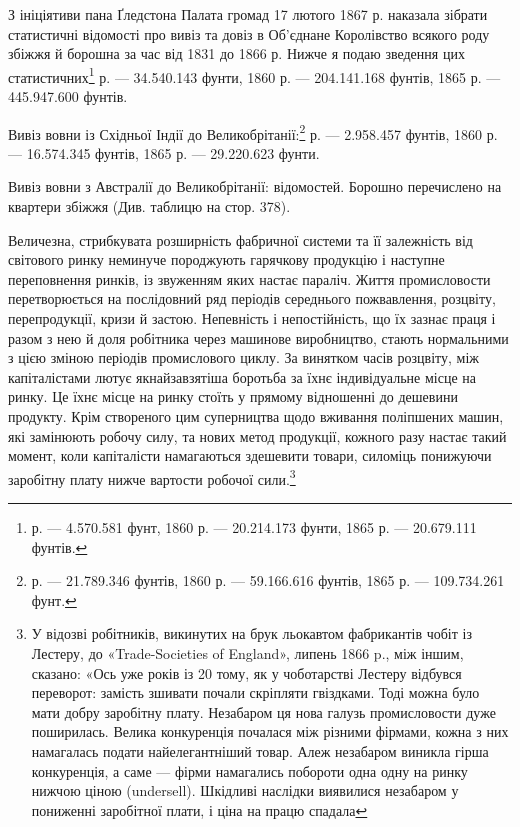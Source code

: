 З ініціятиви пана Ґледстона Палата громад 17 лютого 1867 р.
наказала зібрати статистичні відомості про вивіз та довіз в
Об’єднане Королівство всякого роду збіжжя й борошна за час
від 1831 до 1866 р. Нижче я подаю зведення цих статистичних\footnote{
р. — 4.570.581 фунт, 1860 р. — 20.214.173 фунти, 1865 р. —
20.679.111 фунтів.
} р. — 34.540.143 фунти, 1860 р. — 204.141.168 фунтів, 1865 р. —
445.947.600 фунтів.

Вивіз вовни із Східньої Індії до Великобрітанії:\footnote{
р. — 21.789.346 фунтів, 1860 р. — 59.166.616 фунтів, 1865 р. —
109.734.261 фунт.
} р. — 2.958.457 фунтів, 1860 р. — 16.574.345 фунтів, 1865 р. —
29.220.623 фунти.

Вивіз вовни з Австралії до Великобрітанії:
відомостей. Борошно перечислено на квартери збіжжя (Див.
таблицю на стор. 378).

Величезна, стрибкувата розширність фабричної системи та
її залежність від світового ринку неминуче породжують гарячкову
продукцію і наступне переповнення ринків, із звуженням
яких настає параліч. Життя промисловости перетворюється на
послідовний ряд періодів середнього пожвавлення, розцвіту,
перепродукції, кризи й застою. Непевність і непостійність, що
їх зазнає праця і разом з нею й доля робітника через машинове
виробництво, стають нормальними з цією зміною періодів промислового
циклу. За винятком часів розцвіту, між капіталістами лютує
якнайзавзятіша боротьба за їхнє індивідуальне місце на ринку.
Це їхнє місце на ринку стоїть у прямому відношенні до дешевини
продукту. Крім створеного цим суперництва щодо вживання
поліпшених машин, які замінюють робочу силу, та нових метод
продукції, кожного разу настає такий момент, коли капіталісти
намагаються здешевити товари, силоміць понижуючи заробітну
плату нижче вартости робочої сили.\footnote{
У відозві робітників, викинутих на брук льокавтом фабрикантів
чобіт із Лестеру, до «Trade-Societies of England», липень 1866 p., між
іншим, сказано: «Ось уже років із 20 тому, як у чоботарстві Лестеру
відбувся переворот: замість зшивати почали скріпляти гвіздками. Тоді
можна було мати добру заробітну плату. Незабаром ця нова галузь промисловости
дуже поширилась. Велика конкуренція почалася між різними
фірмами, кожна з них намагалась подати найелегантніший товар. Алеж
незабаром виникла гірша конкуренція, а саме — фірми намагались побороти
одна одну на ринку нижчою ціною (undersell). Шкідливі наслідки виявилися
незабаром у пониженні заробітної плати, і ціна на працю спадала
}


